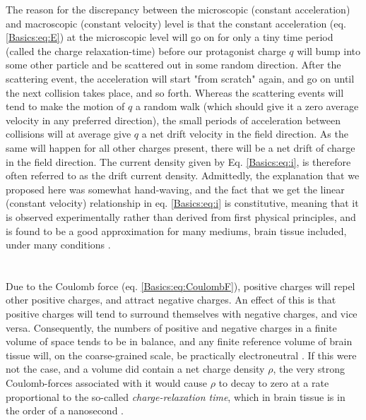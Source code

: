 The reason for the discrepancy between the microscopic (constant acceleration) and macroscopic (constant velocity) level is that the constant acceleration (eq. \ref{Basics:eq:E}) at the microscopic level will go on for only a tiny time period (called the charge relaxation-time)  before our protagonist charge $q$ will bump into some other particle and be scattered out in some random direction. After the scattering event, the acceleration will start "from scratch" again, and go on until the next collision takes place, and so forth. Whereas the scattering events will tend to make the motion of $q$ a random walk (which should give it a zero average velocity in any preferred direction), the small periods of acceleration between collisions will at average give $q$ a net drift velocity in the field direction. As the same will happen for all other charges present, there will be a net drift of charge in the field direction. The current density given by Eq. \ref{Basics:eq:i}, is therefore often referred to as the drift current density. Admittedly, the explanation that we proposed here was somewhat hand-waving, and the fact that we get the linear (constant velocity) relationship in eq. \ref{Basics:eq:i} is constitutive, meaning that it is observed experimentally rather than derived from first physical principles, and is found to be a good approximation for many mediums, brain tissue included, under many conditions \cite{Nunez2006,Pettersen2012}. 


\section{}
\label{sec:Basics:Electroneutrality}
Due to the Coulomb force (eq. \ref{Basics:eq:CoulombF}), positive charges will repel other positive charges, and attract negative charges. An effect of this is that positive charges will tend to surround themselves with negative charges, and vice versa. Consequently, the numbers of positive and negative charges in a finite volume of space tends to be in balance, and any finite reference volume of brain tissue will, on the coarse-grained scale, be practically electroneutral \cite{Nunez2006,Grodzinsky2011}. If this were not the case, and a volume did contain a net charge density $\rho$, the very strong Coulomb-forces associated with it would cause $\rho$ to decay to zero at a rate proportional to the so-called \textit{charge-relaxation time}, which in brain tissue is in the order of a nanosecond \cite{Grodzinsky2011}. 

